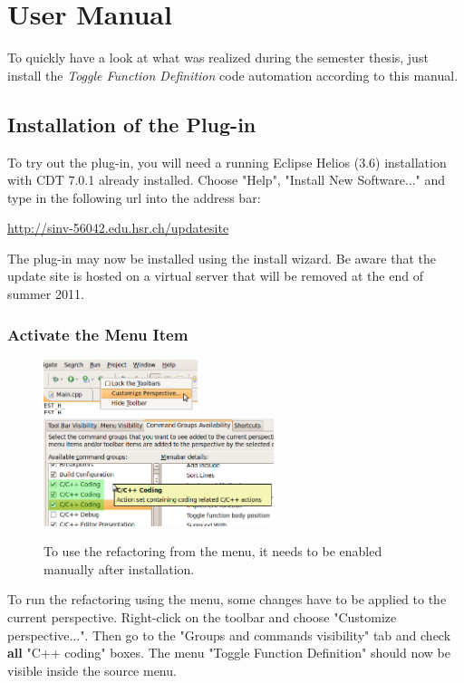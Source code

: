 \chapter{User Manual}
\thispagestyle{fancy}

To quickly have a look at what was realized during the semester thesis, just 
install the \textit{Toggle Function Definition} code automation according to 
this manual.

\section{Installation of the Plug-in}

To try out the plug-in, you will need a running Eclipse Helios (3.6) 
installation with CDT 7.0.1 already installed. Choose "Help", "Install New 
Software..." and type in the following url into the address bar:

\url{http://sinv-56042.edu.hsr.ch/updatesite}

The plug-in may now be installed using the install wizard. Be aware that the 
update site is hosted on a virtual server that will be removed at the end of 
summer 2011.

\subsection{Activate the Menu Item}

\begin{figure}[h]
\includegraphics[width=0.4\textwidth]{images/customizeperspective.png}
\includegraphics[width=0.6\textwidth]{images/commandgroups.png}
\caption{To use the refactoring from the menu, it needs to be enabled manually 
after installation.}
\label{showMenu}
\end{figure}
\label{cmdGroup}
To run the refactoring using the menu, some changes have to be applied to the 
current perspective. Right-click on the toolbar and choose 
"Customize perspective...". Then go to the "Groups and commands visibility" tab 
and check \textbf{all} "C++ coding" boxes. The menu "Toggle Function Definition" 
should now be visible inside the source menu.

